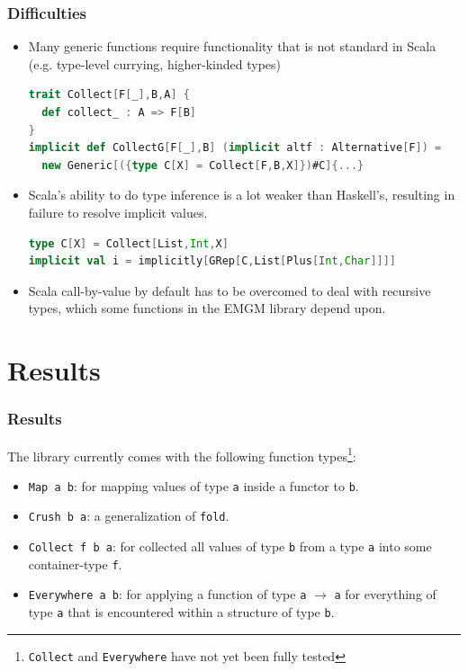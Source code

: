 \documentclass[10pt]{beamer}
\begin{document}
\begin{frame}[fragile]
\frametitle{Difficulties}

\begin{itemize}
\item Many generic functions require functionality that is not standard in Scala (e.g. type-level currying, higher-kinded types)
\begin{lstlisting}[language=Scala,basicstyle=\ttfamily\scriptsize,mathescape]
trait Collect[F[_],B,A] {
  def collect_ : A => F[B]
}
implicit def CollectG[F[_],B] (implicit altf : Alternative[F]) =
  new Generic[({type C[X] = Collect[F,B,X]})#C]{...}
\end{lstlisting}


\item Scala's ability to do type inference is a lot weaker than Haskell's, resulting in failure to resolve implicit values.
\begin{lstlisting}[language=Scala,basicstyle=\ttfamily\scriptsize,mathescape]
type C[X] = Collect[List,Int,X]
implicit val i = implicitly[GRep[C,List[Plus[Int,Char]]]]
\end{lstlisting}

\item Scala call-by-value by default has to be overcomed to deal with recursive types, which some functions in the EMGM library depend upon.
\end{itemize}
\end{frame}

\section{Results}

\begin{frame}
\frametitle{Results}
The library currently comes with the following function types\footnote{\texttt{Collect} and \texttt{Everywhere} have not yet been fully tested}:
\begin{itemize}
\item \texttt{Map a b}: for mapping values of type \texttt{a} inside a functor to \texttt{b}.
\item \texttt{Crush b a}: a generalization of \texttt{fold}.
\item \texttt{Collect f b a}: for collected all values of type \texttt{b} from a type \texttt{a} into some container-type \texttt{f}.
\item \texttt{Everywhere a b}: for applying a function of type \texttt{a} $\rightarrow$ \texttt{a} for everything of type \texttt{a} that is encountered within a structure of type \texttt{b}.
\end{itemize}
\end{frame}
\end{document}
